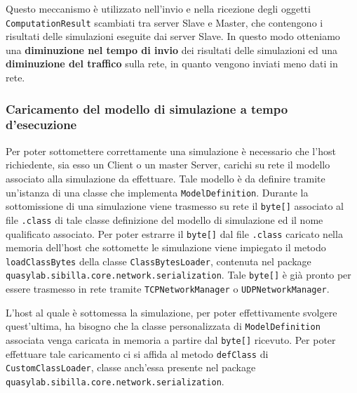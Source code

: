 Questo meccanismo è utilizzato nell'invio e nella ricezione degli oggetti \texttt{ComputationResult} scambiati tra server Slave e Master, che contengono i risultati delle simulazioni eseguite dai server Slave. In questo modo otteniamo una \textbf{diminuzione nel tempo di invio} dei risultati delle simulazioni ed una \textbf{diminuzione del traffico} sulla rete, in quanto vengono inviati meno dati in rete.

\subsubsection{Caricamento del modello di simulazione a tempo d'esecuzione}
Per poter sottomettere correttamente una simulazione è necessario che l'host richiedente, sia esso un Client o un master Server, carichi su rete il modello associato alla simulazione da effettuare. Tale modello è da definire tramite un'istanza di una classe che implementa \texttt{ModelDefinition}.
Durante la sottomissione di una simulazione viene trasmesso su rete il \texttt{byte[]} associato al file \texttt{.class} di tale classe definizione del modello di simulazione ed il nome qualificato associato. Per poter estrarre il \texttt{byte[]} dal file \texttt{.class} caricato nella memoria dell'host che sottomette le simulazione viene impiegato il metodo \texttt{loadClassBytes} della classe \texttt{ClassBytesLoader}, contenuta nel package \texttt{quasylab.sibilla.core.network.serialization}. Tale \texttt{byte[]} è già pronto per essere trasmesso in rete tramite \texttt{TCPNetworkManager} o \texttt{UDPNetworkManager}.

L'host al quale è sottomessa la simulazione, per poter effettivamente svolgere quest'ultima, ha bisogno che la classe personalizzata di \texttt{ModelDefinition} associata venga caricata in memoria a partire dal \texttt{byte[]} ricevuto. Per poter effettuare tale caricamento ci si affida al metodo \texttt{defClass} di \texttt{CustomClassLoader}, classe anch'essa presente nel package \texttt{quasylab.sibilla.core.network.serialization}. 

